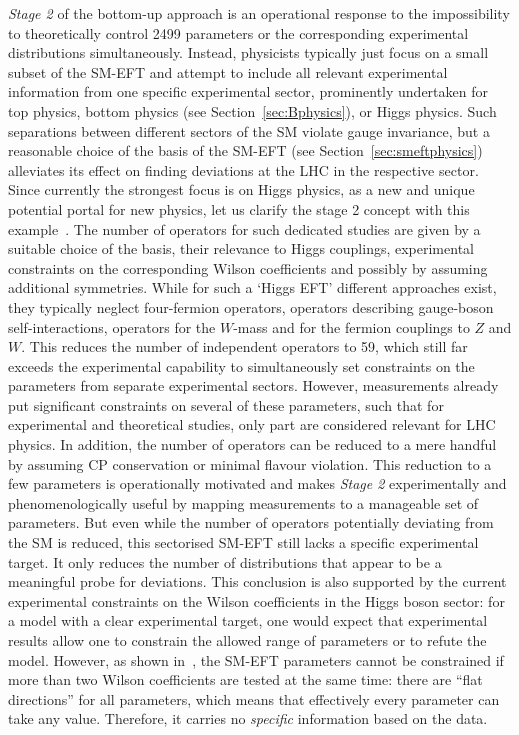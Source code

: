 \emph{Stage 2} of the bottom-up approach is an operational response
to the impossibility to theoretically control 2499 parameters or the corresponding experimental distributions simultaneously. 
Instead, physicists typically just focus on a small subset of the SM-EFT and attempt to include all relevant experimental information from one specific experimental sector, prominently undertaken for top physics, bottom physics (see Section~\ref{sec:Bphysics}), or Higgs physics. 
Such separations between different sectors of the SM
violate gauge invariance, but a reasonable choice of the basis of the
SM-EFT (see Section~\ref{sec:smeftphysics}) alleviates its effect on  
finding deviations at the LHC in the respective sector.
Since currently the strongest focus is on Higgs physics, as a new
and unique potential portal for new physics, let us clarify the stage 2 concept with
this example~\citep{Espinosa:2016ovf,deFlorian:2016spz}.
The number of operators for such dedicated studies are given by a suitable choice
of the basis, their relevance to Higgs couplings,
experimental constraints on the corresponding Wilson coefficients and
possibly by assuming additional symmetries.
While for such a `Higgs EFT' different approaches exist, they typically neglect
four-fermion operators, operators
describing gauge-boson self-interactions, operators for the $W$-mass and 
for the fermion couplings to $Z$ and $W$.
This reduces the number of independent operators to 59, which still far exceeds the experimental capability to simultaneously set constraints on the parameters from separate experimental sectors. 
However, measurements already put significant constraints on several of these parameters, such that for experimental and theoretical studies, only part are considered relevant for LHC physics.
In addition, the number of operators can be reduced to a mere handful by assuming CP conservation or minimal flavour violation.
This reduction to a few parameters is operationally motivated and makes \emph{Stage 2} experimentally and phenomenologically useful by mapping measurements to a manageable set of parameters. 
But even while the number of operators potentially deviating from the SM is reduced, this sectorised SM-EFT still lacks a specific experimental target. 
It only reduces the number of distributions that appear to be a meaningful probe for deviations.
This conclusion is also supported by the current experimental constraints on the Wilson coefficients in the Higgs boson sector: for a model with a clear experimental target, one would expect that experimental results allow one to constrain the allowed range of parameters or to refute the
model. 
However, as shown in~\citep{ATL-PHYS-PUB-2019-042},
the SM-EFT parameters cannot be constrained if more than two Wilson
coefficients are tested at the same time: there are ``flat
directions'' for all parameters, which means that effectively every
parameter can take any value. Therefore, it carries no
\emph{specific} information based on the data.

